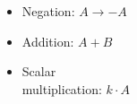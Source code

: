 \begin{itemize}
    \item Negation: $A \rightarrow -A$
    \item Addition: $A+B$
    \item Scalar\\
    multiplication: $k \cdot A$
\end{itemize}